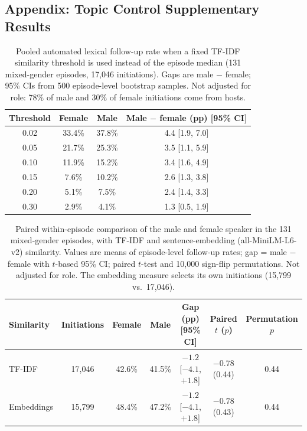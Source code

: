 
\subsection*{Appendix: Topic Control Supplementary Results}

\begin{table}[H]
\centering
\caption{Pooled automated lexical follow-up rate when a fixed TF-IDF similarity threshold is used instead of the episode median (131 mixed-gender episodes, 17,046 initiations). Gaps are male $-$ female; 95\% CIs from 500 episode-level bootstrap samples. Not adjusted for role: 78\% of male and 30\% of female initiations come from hosts.}
\label{tab:tc-thresholds}
\begin{tabular}{cccc}
\toprule
Threshold & Female & Male & Male $-$ female (pp) [95\% CI] \\
\midrule
0.02 & 33.4\% & 37.8\% & 4.4 [1.9, 7.0] \\
0.05 & 21.7\% & 25.3\% & 3.5 [1.1, 5.9] \\
0.10 & 11.9\% & 15.2\% & 3.4 [1.6, 4.9] \\
0.15 &  7.6\% & 10.2\% & 2.6 [1.3, 3.8] \\
0.20 &  5.1\% &  7.5\% & 2.4 [1.4, 3.3] \\
0.30 &  2.9\% &  4.1\% & 1.3 [0.5, 1.9] \\
\bottomrule
\end{tabular}
\end{table}

\begin{table}[H]
\centering
\caption{Paired within-episode comparison of the male and female speaker in the 131 mixed-gender episodes, with TF-IDF and sentence-embedding (all-MiniLM-L6-v2) similarity. Values are means of episode-level follow-up rates; gap = male $-$ female with $t$-based 95\% CI; paired $t$-test and 10,000 sign-flip permutations. Not adjusted for role. The embedding measure selects its own initiations (15,799 vs.\ 17,046).}
\label{tab:tc-within}
\small
\begin{tabular}{lcccccc}
\toprule
Similarity & Initiations & Female & Male & Gap (pp) [95\% CI] & Paired $t$ ($p$) & Permutation $p$ \\
\midrule
TF-IDF     & 17,046 & 42.6\% & 41.5\% & $-1.2$ [$-4.1$, $+1.8$] & $-0.78$ (0.44) & 0.44 \\
Embeddings & 15,799 & 48.4\% & 47.2\% & $-1.2$ [$-4.1$, $+1.8$] & $-0.78$ (0.43) & 0.44 \\
\bottomrule
\end{tabular}
\end{table}

